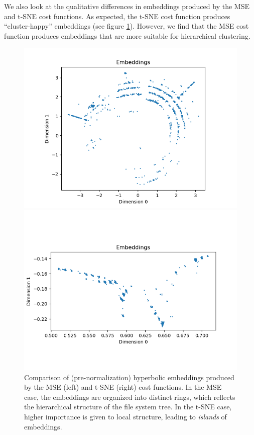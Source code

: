 \documentclass{article}
\begin{document}
We also look at the qualitative differences in embeddings produced by the MSE and t-SNE cost functions. As expected, the t-SNE cost function produces ``cluster-happy'' embeddings (see figure \ref{fig:cost-function-emnbeddings}). However, we find that the MSE cost function produces embeddings that are more suitable for hierarchical clustering.

\begin{figure}[H]
  \begin{minipage}{0.5\textwidth}
    \centering
    \includegraphics[width=\linewidth]{figures/mse_cost.png}
  \end{minipage}%
  \begin{minipage}{0.5\textwidth}
    \centering
    \includegraphics[width=\linewidth]{figures/tsne_cost.png}
  \end{minipage}
  \caption{Comparison of (pre-normalization) hyperbolic embeddings produced by the MSE (left) and t-SNE (right) cost functions. In the MSE case, the embeddings are organized into distinct rings, which reflects the hierarchical structure of the file system tree. In the t-SNE case, higher importance is given to local structure, leading to \emph{islands} of embeddings.}
  \label{fig:cost-function-emnbeddings}
\end{figure}
\end{document}
